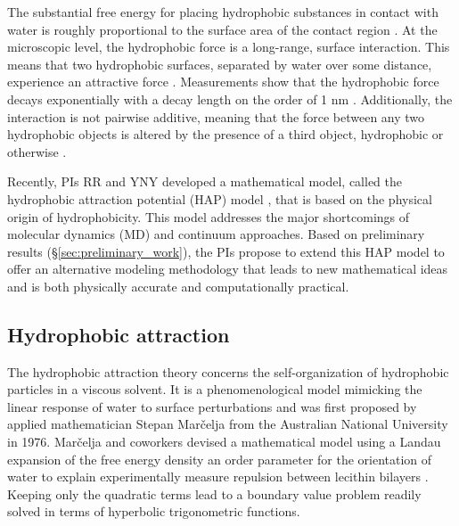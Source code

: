 The substantial free energy for placing hydrophobic substances in contact with water 
is roughly proportional to the surface area of the contact region \cite{Bjorneholm2016}.  
At the microscopic level, the hydrophobic force is a long-range, surface
interaction. This means that two hydrophobic surfaces, separated by
water over some distance, experience an attractive force
\cite{Lum1999,Meyer2006,Hammer2010}. Measurements show that the
hydrophobic force decays exponentially with a decay length on the order of 1 nm
\cite{Israelachvili1984, Marcelja1977,Christenson2001,Lin2005}. 
Additionally, the interaction is not pairwise additive, meaning that
the force between any two hydrophobic objects is altered by the presence
of a third object, hydrophobic or otherwise \cite{SilveraBatista1242477}. 

Recently, PIs RR and YNY developed a mathematical model, called the
hydrophobic attraction potential (HAP) model \cite{Fu2018_SIAM}, that is based
on the physical origin of hydrophobicity. This model addresses the major
shortcomings of molecular dynamics (MD) and continuum approaches. Based
on preliminary results (\S\ref{sec:preliminary_work}), the PIs propose to
extend this HAP model to offer an alternative modeling methodology that
leads to new mathematical ideas and is both physically accurate and
computationally practical.

\subsection{Hydrophobic attraction}
The hydrophobic attraction theory concerns the 
self-organization of hydrophobic particles in a viscous solvent.  
It is a phenomenological model mimicking the 
linear response of water to surface perturbations
and was first proposed by applied mathematician 
Stepan Mar\v{c}elja from the Australian National University in 1976.  
Mar\v{c}elja and coworkers devised a mathematical
model using a Landau expansion of the free energy density 
an order parameter  for the orientation of water 
to explain experimentally measure repulsion between lecithin bilayers 
 \cite{LeRaPa76, MaRa76, LandauLifschitz}.   
Keeping only the quadratic terms lead to a boundary value problem 
readily solved in terms of hyperbolic trigonometric functions. 

